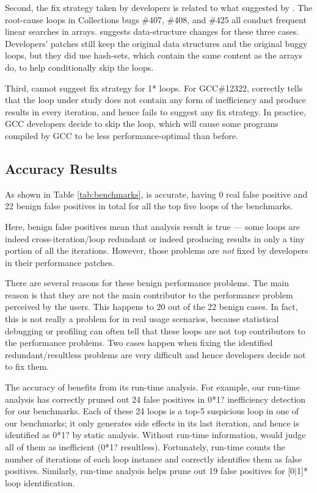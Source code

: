 Second, the fix strategy taken by developers is related to
what suggested by \Tool.
The root-cause loops in 
Collections bugs \#407, \#408, and \#425 all conduct frequent linear searches in arrays.
\Tool suggests data-structure changes for these three cases. Developers' patches 
still keep the original data structures and the original buggy loops, but they
did use hash-sets, which contain the same content as the arrays do,
to help conditionally skip the loops. 

Third, \Tool cannot suggest fix strategy for 1* loops.
For GCC\#12322, \Tool correctly tells that the loop under study
does not contain any form of inefficiency and produce results in every 
iteration, and hence fails to suggest any fix strategy. In practice, GCC
developers decide to skip the loop, which will cause some programs compiled by
GCC
to be less performance-optimal than before. 

\subsection{Accuracy Results}
\label{sec:result_acc}

%

As shown in Table \ref{tab:benchmarks}, \Tool is accurate, having 0 real
false positive and 22 benign false positives in total for all the top five loops
of the \allbugs benchmarks.

Here, benign false positives mean that \Tool analysis result is true ---
some loops are indeed cross-iteration/loop redundant or indeed producing
results in only a tiny portion of all the iterations. However, those
problems are \textit{not} fixed by developers in their performance patches. 

There are several reasons for these benign performance problems. 
The main reason is that they are not the main contributor to the 
performance problem perceived by the users. This happens to 20 out of the
22 benign cases. %
In fact, this is not really a problem for \Tool in 
real usage scenarios, because statistical debugging or profiling can often
tell that these loops are not top contributors to the performance
problems.
Two cases happen when fixing the 
identified redundant/resultless problems
are very difficult and hence developers decide not to fix them.

The accuracy of \Tool benefits from its run-time analysis.
For example, our run-time analysis has correctly pruned out 24 false positives
in 0*1? inefficiency detection for our benchmarks. Each of these 24 loops is a
top-5 suspicious loop in one of our benchmarks; it only generates side effects
in its last iteration, and hence is identified as 0*1? by static analysis. 
Without run-time information, \Tool would judge
all of them as inefficient (0*1? resultless). Fortunately,
\Tool run-time counts the number of iterations of each loop instance and
correctly identifies them as false positives. Similarly, \Tool run-time analysis
helps prune out 19 false positives for [0$|$1]* loop identification.

